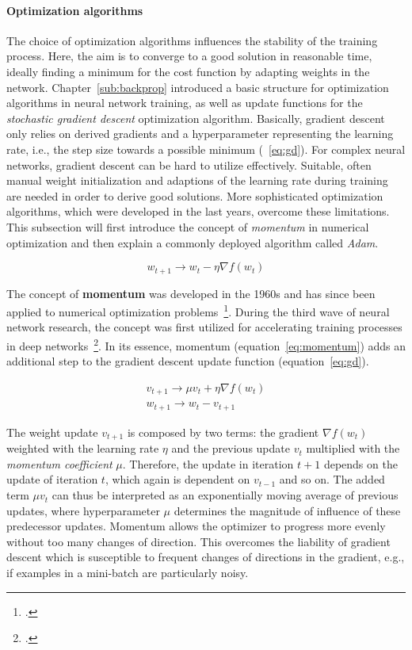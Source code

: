 \paragraph{Optimization algorithms}
\label{sub:dl_optimization_algos}

The choice of optimization algorithms influences the stability of the training
process.
Here, the aim is to converge to a good solution in reasonable time, ideally
finding a minimum for the cost function by adapting weights in the network.
Chapter~\ref{sub:backprop} introduced a basic structure for optimization
algorithms in neural network training, as well as update functions for the
\textit{stochastic gradient descent} optimization algorithm.
Basically, gradient descent only relies on derived gradients and a hyperparameter
representing the learning rate, i.e., the step size towards a possible minimum
(~\ref{eq:gd}).
For complex neural networks, gradient descent can be hard to utilize effectively.
Suitable, often manual weight initialization and adaptions of the learning rate
during training are needed in order to derive good solutions.
More sophisticated optimization algorithms, which were developed in the last
years, overcome these limitations.
This subsection will first introduce the concept of \textit{momentum} in
numerical optimization and then explain a commonly deployed algorithm called
\textit{Adam}.

\begin{equation}
  \label{eq:gd}
  w_{t+1} \rightarrow w_t - \eta \nabla f(w_t)
\end{equation}

The concept of \textbf{momentum} was developed in the 1960s and has since been applied
to numerical optimization problems~\footcite{Polyak1964}.
During the third wave of neural network research, the concept was first
utilized for accelerating training processes in deep networks~\footcite{Sutskever2013}.
In its essence, momentum (equation~\ref{eq:momentum}) adds an additional step to 
the gradient descent update function (equation~\ref{eq:gd}).

\begin{align}
  \label{eq:momentum}
  v_{t+1} \rightarrow \mu v_t + \eta \nabla f(w_t) \\
  w_{t+1} \rightarrow w_t - v_{t+1}
\end{align}

The weight update $v_{t+1}$ is composed by two terms: the gradient $\nabla f(w_t)$
weighted with the learning rate $\eta$ and the previous update $v_t$ multiplied
with the \textit{momentum coefficient} $\mu$.
Therefore, the update in iteration $t+1$ depends on the update of iteration $t$,
which again is dependent on $v_{t-1}$ and so on.
The added term $\mu v_t$ can thus be interpreted as an exponentially moving 
average of previous updates, where hyperparameter $\mu$ determines the magnitude 
of influence of these predecessor updates.
Momentum allows the optimizer to progress more evenly without too many changes
of direction.
This overcomes the liability of gradient descent which is susceptible to
frequent changes of directions in the gradient, e.g., if examples in a mini-batch
are particularly noisy.

